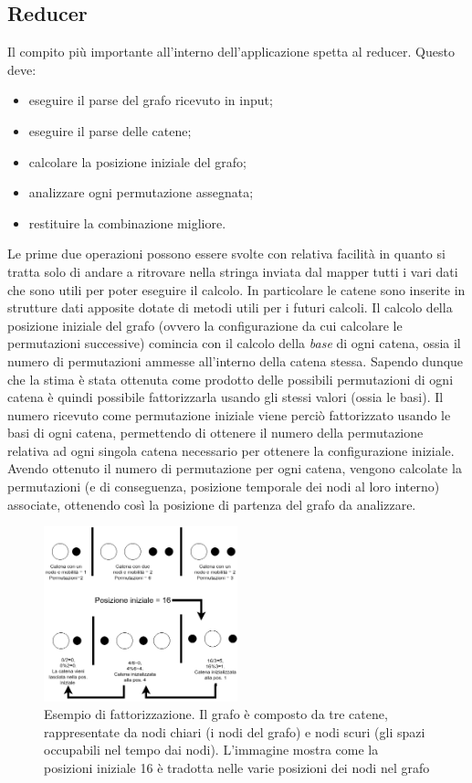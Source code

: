 \documentclass[]{IEEEtran}
\begin{document}
\subsection{Reducer}
Il compito più importante all'interno dell'applicazione spetta al reducer. Questo deve:
\begin{itemize}
	\item eseguire il parse del grafo ricevuto in input;
	\item eseguire il parse delle catene;
	\item calcolare la posizione iniziale del grafo;
	\item analizzare ogni permutazione assegnata;
	\item restituire la combinazione migliore.
\end{itemize}
Le prime due operazioni possono essere svolte con relativa facilità in quanto si tratta solo di andare a ritrovare nella stringa inviata dal mapper tutti i vari dati che sono utili per poter eseguire il calcolo. In particolare le catene sono inserite in strutture dati apposite dotate di metodi utili per i futuri calcoli. 
Il calcolo della posizione iniziale del grafo (ovvero la configurazione da cui calcolare le permutazioni successive) comincia con il calcolo della \emph{base} di ogni catena, ossia il numero di permutazioni ammesse all'interno della catena stessa. Sapendo dunque che la stima è stata ottenuta come prodotto delle possibili permutazioni di ogni catena è quindi possibile fattorizzarla usando gli stessi valori (ossia le basi). Il numero ricevuto come permutazione iniziale viene perciò fattorizzato usando le basi di ogni catena, permettendo di ottenere il numero della permutazione relativa ad ogni singola catena necessario per ottenere la configurazione iniziale. Avendo ottenuto il numero di permutazione per ogni catena, vengono calcolate la permutazioni (e di conseguenza, posizione temporale dei nodi al loro interno) associate, ottenendo così la posizione di partenza del grafo da analizzare.
\begin{figure}[htp]
	\centering
	\includegraphics[width=0.5\textwidth]{images/fact.png}
	\caption{Esempio di fattorizzazione. Il grafo è composto da tre catene, rappresentate da nodi chiari (i nodi del grafo) e nodi scuri (gli spazi occupabili nel tempo dai nodi). L'immagine mostra come la posizioni iniziale 16 è tradotta nelle varie posizioni dei nodi nel grafo}
\end{figure}
\end{document}
